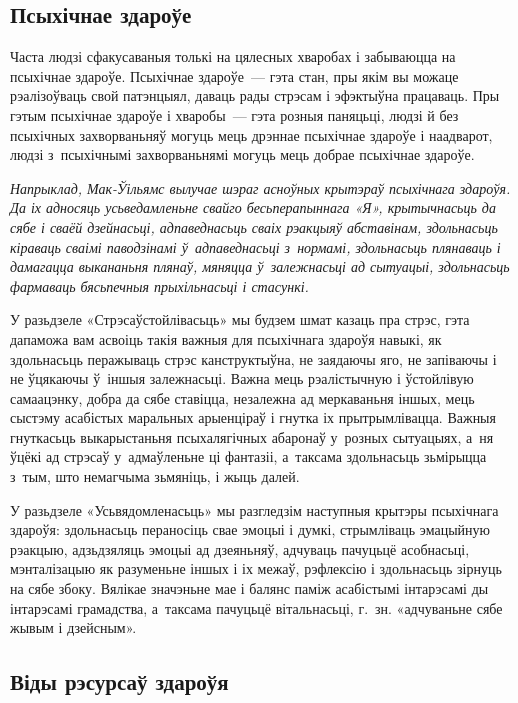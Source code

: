 \subsection*{Псыхічнае здароўе}

Часта людзі сфакусаваныя толькі на цялесных хваробах і забываюцца на псыхічнае здароўе. Псыхічнае здароўе~--- гэта стан, пры якім вы можаце рэалізоўваць свой патэнцыял, даваць рады стрэсам і эфэктыўна працаваць. Пры гэтым псыхічнае здароўе і хваробы~--- гэта розныя паняцьці, людзі й без псыхічных захворваньняў могуць мець дрэннае псыхічнае здароўе і наадварот, людзі з~псыхічнымі захворваньнямі могуць мець добрае псыхічнае здароўе.

\emph{Напрыклад, Мак-Ўільямс вылучае шэраг асноўных крытэраў псыхічнага здароўя. Да іх адносяць усьведамленьне свайго бесьперапыннага «Я», крытычнасьць да сябе і сваёй дзейнасьці, адпаведнасьць сваіх рэакцыяў абставінам, здольнасьць кіраваць сваімі паводзінамі ў~адпаведнасьці з~нормамі, здольнасьць плянаваць і дамагацца выкананьня плянаў, мяняцца ў~залежнасьці ад сытуацыі, здольнасьць фармаваць бясьпечныя прыхільнасьці і стасункі.}

У разьдзеле «Стрэсаўстойлівасьць» мы будзем шмат казаць пра стрэс, гэта дапаможа вам асвоіць такія важныя для псыхічнага здароўя навыкі, як здольнасьць перажываць стрэс канструктыўна, не заядаючы яго, не запіваючы і не ўцякаючы ў~іншыя залежнасьці. Важна мець рэалістычную і ўстойлівую самаацэнку, добра да сябе ставіцца, незалежна ад меркаваньня іншых, мець сыстэму асабістых маральных арыенціраў і гнутка іх прытрымлівацца. Важныя гнуткасьць выкарыстаньня псыхалягічных абаронаў у~розных сытуацыях, а~ня ўцёкі ад стрэсаў у~адмаўленьне ці фантазіі, а~таксама здольнасьць зьмірыцца з~тым, што немагчыма зьмяніць, і жыць далей.

У разьдзеле «Усьвядомленасьць» мы разгледзім наступныя крытэры псыхічнага здароўя: здольнасьць пераносіць свае эмоцыі і думкі, стрымліваць эмацыйную рэакцыю, адзьдзяляць эмоцыі ад дзеяньняў, адчуваць пачуцьцё асобнасьці, мэнталізацыю як разуменьне іншых і іх межаў, рэфлексію і здольнасьць зірнуць на сябе збоку. Вялікае значэньне мае і балянс паміж асабістымі інтарэсамі ды інтарэсамі грамадства, а~таксама пачуцьцё вітальнасьці, г.~зн. «адчуваньне сябе жывым і дзейсным».

\subsection*{Віды рэсурсаў здароўя}

